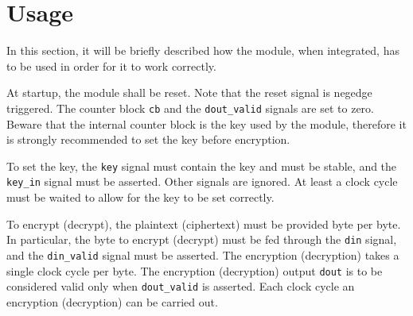 \section{Usage}
\label{sec:usage}
In this section, it will be briefly described how the module, when integrated, has to be used in order for it to work correctly.

At startup, the module shall be reset. Note that the reset signal is negedge triggered. The counter block \lstinline{cb} and the \lstinline{dout_valid} signals are set to zero.
Beware that the internal counter block is the key used by the module, therefore it is strongly recommended to set the key before encryption.

To set the key, the \lstinline{key} signal must contain the key and must be stable, and the \lstinline{key_in} signal must be asserted. Other signals are ignored. At least a clock cycle must be waited to allow for the key to be set correctly.

To encrypt (decrypt), the plaintext (ciphertext) must be provided byte per byte. In particular, the byte to encrypt (decrypt) must be fed through the \lstinline{din} signal, and the \lstinline{din_valid} signal must be asserted. The encryption (decryption) takes a single clock cycle per byte. The encryption (decryption) output \lstinline{dout} is to be considered valid only when \lstinline{dout_valid} is asserted. Each clock cycle an encryption (decryption) can be carried out.